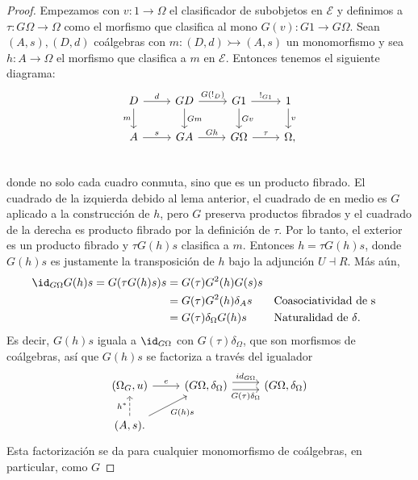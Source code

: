 \begin{proof}
  Empezamos con $v\colon 1\to \Omega$ el clasificador de subobjetos en $\mathcal{E}$ y definimos a $\tau\colon G\Omega\to \Omega$
  como el morfismo que clasifica al mono $G(v)\colon G1\to G\Omega$. Sean $(A,s),(D,d)$ coálgebras con $m\colon (D,d)\rightarrowtail (A,s)$
  un monomorfismo y sea $h\colon A\to \Omega$ el morfismo que clasifica a $m$ en $\mathcal{E}$. Entonces
  tenemos el siguiente diagrama:
  \begin{equation*}
    \label{eq:clasificadorm}
    \begin{tikzcd}
      D\ar{r}{d}\ar[swap]{d}{m} & GD\ar{r}{G(!_D)}\ar{d}{Gm} & G1\ar{r}{!_{G1}}\ar{d}{Gv} & 1\ar{d}{v} \\
      A\ar{r}{s} & GA\ar{r}{Gh} & G\Omega\ar{r}{\tau} & \Omega\mathrlap{,} \\
    \end{tikzcd}
  \end{equation*}
  donde no solo cada cuadro conmuta, sino que es un producto fibrado. El cuadrado de la izquierda debido
  al lema anterior, el cuadrado de en medio es $G$ aplicado a la construcción de $h$, pero $G$ preserva
  productos fibrados y el cuadrado de la derecha es producto fibrado por la definición de $\tau$.
  Por lo tanto, el exterior es un producto fibrado y $\tau G(h)s$ clasifica a $m$. Entonces $h=\tau G(h)s$,
  donde $G(h)s$ es justamente la transposición de $h$ bajo la adjunción $U\dashv R$. Más aún,
  \begin{align*}
    \id_{G\Omega}G(h)s = G(\tau G(h)s) s &= G(\tau)G^2(h)G(s)s \\
    &=G(\tau)G^2(h)\delta_A s  && \text{Coasociatividad de s} \\
    &=G(\tau)\delta_{\Omega}G(h)s && \text{Naturalidad de $\delta$}.
  \end{align*}
  Es decir, $G(h)s$ iguala a $\id_{G\Omega}$ con $G(\tau)\delta_{\Omega}$, que son morfismos de coálgebras,
  así que $G(h)s$ se factoriza a través del igualador
  \begin{equation*}
    \begin{tikzcd}
      (\Omega_G,u)\ar{r}{e} & (G\Omega,\delta_{\Omega})\ar[shift left=0.75ex]{r}{id_{G\Omega}}\ar[swap, shift right=0.75ex]{r}{G(\tau)\delta_{\Omega}} & (G\Omega,\delta_{\Omega}) \\
      (A,s).\ar[dashed]{u}{h^*}\ar[swap]{ru}{G(h)s}
    \end{tikzcd}
  \end{equation*}
  Esta factorización se da para cualquier monomorfismo de coálgebras, en particular, como $G$

\end{proof}
